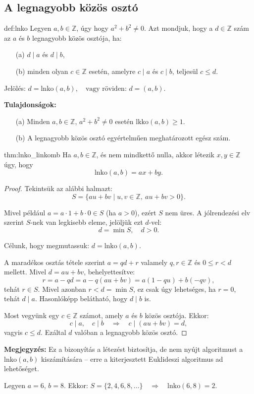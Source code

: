\subsection*{A legnagyobb közös osztó}
\begin{definition}{def:lnko}
Legyen $a,b\in\mathbb{Z}$, úgy hogy $a^{2}+b^{2}\neq0$. Azt mondjuk,
hogy a $d\in\mathbb{Z}$ szám az $a$ és $b$ legnagyobb közös osztója,
ha:
\begin{itemize}
\item[(a)] $d\mid a$ és $d\mid b$,
\item[(b)] minden olyan $c\in\mathbb{Z}$ esetén, amelyre $c\mid a$ és $c\mid b$,
teljesül $c\leq d$.
\end{itemize}
Jelölés: $d=\mathrm{lnko}(a,b),\quad\text{vagy röviden: }d=(a,b).$
\end{definition}

\textbf{Tulajdonságok:} 
\begin{itemize}
\item[(a)] Minden $a,b\in\mathbb{Z}$, $a^{2}+b^{2}\neq0$ esetén $\mathrm{lkko}(a,b)\geq1$. 
\item[(b)] A legnagyobb közös osztó egyértelműen meghatározott egész szám. 
\end{itemize}
\begin{theorem}{thm:lnko_linkomb}
Ha $a,b\in\mathbb{Z}$, és nem mindkettő nulla, akkor létezik $x,y\in\mathbb{Z}$
úgy, hogy 
\[
\mathrm{lnko}(a,b)=ax+by.
\]
\end{theorem}

\begin{proof}
Tekintsük az alábbi halmazt: 
\[
S=\{au+bv\mid u,v\in\mathbb{Z},\ au+bv>0\}.
\]

Mivel például $a=a\cdot1+b\cdot0\in S$ (ha $a>0$), ezért $S$ nem
üres. A jólrendezési elv szerint $S$-nek van legkisebb eleme, jelöljük
ezt $d$-vel: 
\[
d=\min S,\quad d>0.
\]

Célunk, hogy megmutassuk: $d=\mathrm{lnko}(a,b)$.

A maradékos osztás tétele szerint $a=qd+r$ valamely $q,r\in\mathbb{Z}$
és $0\leq r<d$ mellett. Mivel $d=au+bv$, behelyettesítve: 
\[
r=a-qd=a-q(au+bv)=a(1-qu)+b(-qv),
\]
tehát $r\in S$. Mivel azonban $r<d=\min S$, ez csak úgy lehetséges,
ha $r=0$, tehát $d\mid a$. Hasonlóképp belátható, hogy $d\mid b$
is.

Most vegyünk egy $c\in\mathbb{Z}$ számot, amely $a$ és $b$ közös
osztója. Ekkor: 
\[
c\mid a,\quad c\mid b\quad\Rightarrow\quad c\mid(au+bv)=d,
\]
vagyis $c\leq d$. Ezáltal $d$ valóban a legnagyobb közös osztó.
\end{proof}
\textbf{Megjegyzés:} Ez a bizonyítás a létezést biztosítja, de nem
nyújt algoritmust a $\mathrm{lnko}(a,b)$ kiszámítására -- erre a
kiterjesztett Euklideszi algoritmus ad lehetőséget.
\begin{example}
Legyen $a=6$, $b=8$. Ekkor: $S=\{2,4,6,8,\dots\}\quad\Rightarrow\quad\mathrm{lnko}(6,8)=2.$
\end{example}

